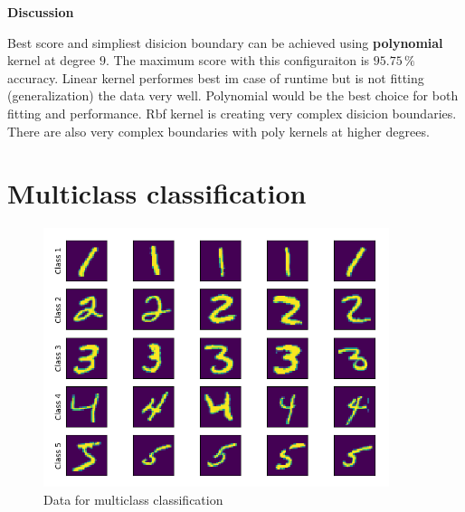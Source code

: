 \documentclass[12pt,a4paper]{article}
\begin{document}
\begin{enumerate}[a)]
\textbf{Discussion}

Best score and simpliest disicion boundary can be achieved using
\textbf{polynomial} kernel at degree $9$. The maximum score with this
configuraiton is $95.75\,\%$ accuracy. Linear kernel performes best im case of
runtime but is not fitting (generalization) the data very well. Polynomial would
be the best choice for both fitting and performance. Rbf kernel is creating very
complex disicion boundaries. There are also very complex boundaries with poly
kernels at higher degrees.

\end{enumerate}

\section{Multiclass classification}

\begin{figure}[H]
	\centering
  \includegraphics[width=0.9\textwidth]{figures/data3.png}
	\caption{Data for multiclass classification}
	\label{data3}
\end{figure}
\end{document}
